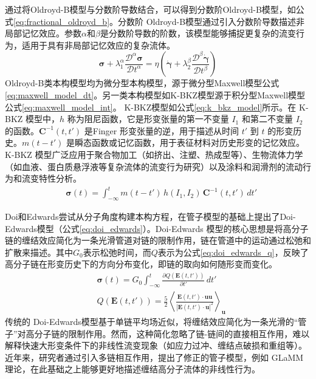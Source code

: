 通过将Oldroyd-B模型与分数阶导数结合，可以得到分数阶Oldroyd-B模型，如公式\eqref{eq:fractional_oldroyd_b}。分数阶 Oldroyd-B模型通过引入分数阶导数描述非局部记忆效应。参数$\alpha$和$\beta$是分数阶导数的阶数，该模型能够捕捉更复杂的流变行为，适用于具有非局部记忆效应的复杂流体。
\begin{equation}
	\boldsymbol{\sigma} + \lambda_1^\alpha \frac{\mathcal{D}^\alpha \boldsymbol{\sigma}}{\mathcal{D}t^\alpha} = \eta \left( \dot{\boldsymbol{\gamma}} + \lambda_2^\beta \frac{\mathcal{D}^\beta \dot{\boldsymbol{\gamma}}}{\mathcal{D}t^\beta} \right) \label{eq:fractional_oldroyd_b}
\end{equation}
Oldroyd-B类本构模型均为微分型本构模型，源于微分型Maxwell模型公式\eqref{eq:maxwell_model_dt}。另一类本构模型如K-BKZ模型源于积分型Maxwell模型公式\eqref{eq:maxwell_model_int}。
K-BKZ模型如公式\eqref{eq:k_bkz_model}所示。在 K-BKZ 模型中，$h$ 称为阻尼函数，它是形变张量的第一不变量 $I_1$ 和第二不变量 $I_2$ 的函数。$\mathbf{C}^{-1}(t,t')$ 是Finger 形变张量的逆，用于描述从时间 $t'$ 到 $t$ 的形变历史。$m(t-t')$ 是瞬态函数或记忆函数，用于表征材料对历史形变的记忆效应。K-BKZ 模型广泛应用于聚合物加工（如挤出、注塑、热成型等）、生物流体力学（如血液、蛋白质悬浮液等复杂流体的流变行为研究）以及涂料和润滑剂的流动行为和流变特性分析。
\begin{align}
	 & \boldsymbol{\sigma}(t)  = \int_{-\infty}^t m(t-t') \, h(I_1, I_2) \, \mathbf{C}^{-1}(t,t') \, dt'    \label{eq:k_bkz_model}
\end{align}

Doi和Edwards尝试从分子角度构建本构方程，在管子模型的基础上提出了Doi-Edwards模型（公式\eqref{eq:doi_edwards}）。Doi-Edwards 模型的核心思想是将高分子链的缠结效应简化为一条光滑管道对链的限制作用，链在管道中的运动通过松弛和扩散来描述。其中$G_0$表示松弛时间，而$Q$表示为公式\eqref{eq:doi_edwards_q}，反映了高分子链在形变历史下的方向分布变化，即链的取向如何随形变而变化。
\begin{align}
	 & \boldsymbol{\sigma}(t)  = G_0 \int_{-\infty}^t \frac{\partial Q(\mathbf{E}(t,t'))}{\partial t'} \, dt'    \label{eq:doi_edwards}                                                                  \\
	 & Q(\mathbf{E}(t,t'))     = \frac{5}{2} \left\langle \frac{\mathbf{E}(t,t') \cdot \mathbf{u} \mathbf{u}}{|\mathbf{E}(t,t') \cdot \mathbf{u}|^2} \right\rangle_{\mathbf{u}} \label{eq:doi_edwards_q}
\end{align}
传统的 Doi-Edwards模型基于单链平均场近似，将缠结效应简化为一条光滑的“管子”对高分子链的限制作用。然而，这种简化忽略了链-链间的直接相互作用，难以解释快速大形变条件下的非线性流变现象（如应力过冲、缠结点破损和重组等）。近年来，研究者通过引入多链相互作用，提出了修正的管子模型，例如 GLaMM 理论，在此基础之上能够更好地描述缠结高分子流体的非线性行为。

